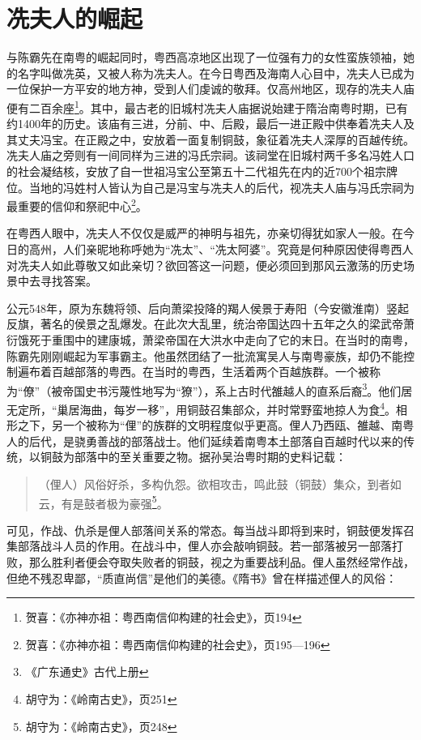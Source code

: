 \section{冼夫人的崛起}

与陈霸先在南粤的崛起同时，粤西高凉地区出现了一位强有力的女性蛮族领袖，她的名字叫做冼英，又被人称为冼夫人。在今日粤西及海南人心目中，冼夫人已成为一位保护一方平安的地方神，受到人们虔诚的敬拜。仅高州地区，现存的冼夫人庙便有二百余座\footnote{贺喜：《亦神亦祖：粤西南信仰构建的社会史》，页194}。其中，最古老的旧城村冼夫人庙据说始建于隋治南粤时期，已有约1400年的历史。该庙有三进，分前、中、后殿，最后一进正殿中供奉着冼夫人及其丈夫冯宝。在正殿之中，安放着一面复制铜鼓，象征着冼夫人深厚的百越传统。冼夫人庙之旁则有一间同样为三进的冯氏宗祠。该祠堂在旧城村两千多名冯姓人口的社会凝结核，安放了自一世祖冯宝公至第五十二代祖先在内的近700个祖宗牌位。当地的冯姓村人皆认为自己是冯宝与冼夫人的后代，视冼夫人庙与冯氏宗祠为最重要的信仰和祭祀中心\footnote{贺喜：《亦神亦祖：粤西南信仰构建的社会史》，页195—196}。

在粤西人眼中，冼夫人不仅仅是威严的神明与祖先，亦亲切得犹如家人一般。在今日的高州，人们亲昵地称呼她为“冼太”、“冼太阿婆”。究竟是何种原因使得粤西人对冼夫人如此尊敬又如此亲切？欲回答这一问题，便必须回到那风云激荡的历史场景中去寻找答案。

公元548年，原为东魏将领、后向萧梁投降的羯人侯景于寿阳（今安徽淮南）竖起反旗，著名的侯景之乱爆发。在此次大乱里，统治帝国达四十五年之久的梁武帝萧衍饿死于重围中的建康城，萧梁帝国在大洪水中走向了它的末日。在当时的南粤，陈霸先刚刚崛起为军事霸主。他虽然团结了一批流寓吴人与南粤豪族，却仍不能控制遍布着百越部落的粤西。在当时的粤西，生活着两个百越族群。一个被称为“僚”（被帝国史书污蔑性地写为“獠”），系上古时代雒越人的直系后裔\footnote{《广东通史》古代上册}。他们居无定所，“巢居海曲，每岁一移”，用铜鼓召集部众，并时常野蛮地掠人为食\footnote{胡守为：《岭南古史》，页251}。相形之下，另一个被称为“俚”的族群的文明程度似乎更高。俚人乃西瓯、雒越、南粤人的后代，是骁勇善战的部落战士。他们延续着南粤本土部落自百越时代以来的传统，以铜鼓为部落中的至关重要之物。据孙吴治粤时期的史料记载：

\begin{quote}
	（俚人）风俗好杀，多构仇怨。欲相攻击，鸣此鼓（铜鼓）集众，到者如云，有是鼓者极为豪强\footnote{胡守为：《岭南古史》，页248}。
\end{quote}


可见，作战、仇杀是俚人部落间关系的常态。每当战斗即将到来时，铜鼓便发挥召集部落战斗人员的作用。在战斗中，俚人亦会敲响铜鼓。若一部落被另一部落打败，那么胜利者便会夺取失败者的铜鼓，视之为重要战利品。俚人虽然经常作战，但绝不残忍卑鄙，“质直尚信”是他们的美德。《隋书》曾在样描述俚人的风俗：

